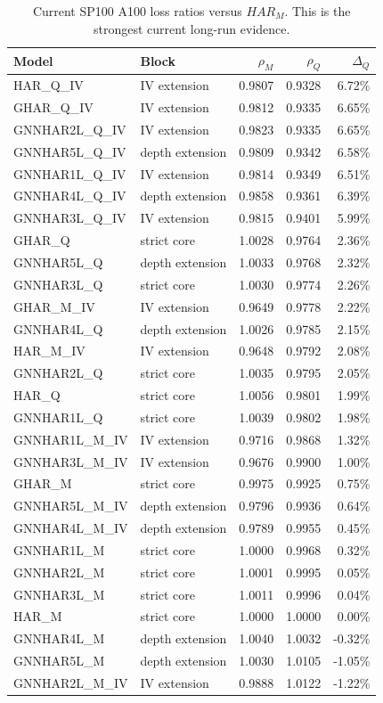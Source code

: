 \begin{table}[H]
\centering
\scriptsize
\begin{tabular}{llrrr}
\toprule
Model & Block & $\rho_M$ & $\rho_Q$ & $\Delta_Q$ \\
\midrule
HAR\_Q\_IV & IV extension & 0.9807 & 0.9328 & 6.72\% \\
GHAR\_Q\_IV & IV extension & 0.9812 & 0.9335 & 6.65\% \\
GNNHAR2L\_Q\_IV & IV extension & 0.9823 & 0.9335 & 6.65\% \\
GNNHAR5L\_Q\_IV & depth extension & 0.9809 & 0.9342 & 6.58\% \\
GNNHAR1L\_Q\_IV & IV extension & 0.9814 & 0.9349 & 6.51\% \\
GNNHAR4L\_Q\_IV & depth extension & 0.9858 & 0.9361 & 6.39\% \\
GNNHAR3L\_Q\_IV & IV extension & 0.9815 & 0.9401 & 5.99\% \\
GHAR\_Q & strict core & 1.0028 & 0.9764 & 2.36\% \\
GNNHAR5L\_Q & depth extension & 1.0033 & 0.9768 & 2.32\% \\
GNNHAR3L\_Q & strict core & 1.0030 & 0.9774 & 2.26\% \\
GHAR\_M\_IV & IV extension & 0.9649 & 0.9778 & 2.22\% \\
GNNHAR4L\_Q & depth extension & 1.0026 & 0.9785 & 2.15\% \\
HAR\_M\_IV & IV extension & 0.9648 & 0.9792 & 2.08\% \\
GNNHAR2L\_Q & strict core & 1.0035 & 0.9795 & 2.05\% \\
HAR\_Q & strict core & 1.0056 & 0.9801 & 1.99\% \\
GNNHAR1L\_Q & strict core & 1.0039 & 0.9802 & 1.98\% \\
GNNHAR1L\_M\_IV & IV extension & 0.9716 & 0.9868 & 1.32\% \\
GNNHAR3L\_M\_IV & IV extension & 0.9676 & 0.9900 & 1.00\% \\
GHAR\_M & strict core & 0.9975 & 0.9925 & 0.75\% \\
GNNHAR5L\_M\_IV & depth extension & 0.9796 & 0.9936 & 0.64\% \\
GNNHAR4L\_M\_IV & depth extension & 0.9789 & 0.9955 & 0.45\% \\
GNNHAR1L\_M & strict core & 1.0000 & 0.9968 & 0.32\% \\
GNNHAR2L\_M & strict core & 1.0001 & 0.9995 & 0.05\% \\
GNNHAR3L\_M & strict core & 1.0011 & 0.9996 & 0.04\% \\
HAR\_M & strict core & 1.0000 & 1.0000 & 0.00\% \\
GNNHAR4L\_M & depth extension & 1.0040 & 1.0032 & -0.32\% \\
GNNHAR5L\_M & depth extension & 1.0030 & 1.0105 & -1.05\% \\
GNNHAR2L\_M\_IV & IV extension & 0.9888 & 1.0122 & -1.22\% \\
\bottomrule
\end{tabular}
\caption{Current SP100 A100 loss ratios versus \(HAR_M\).  This is the strongest current long-run evidence.}
\label{tab:sp100-a100-loss}
\end{table}
